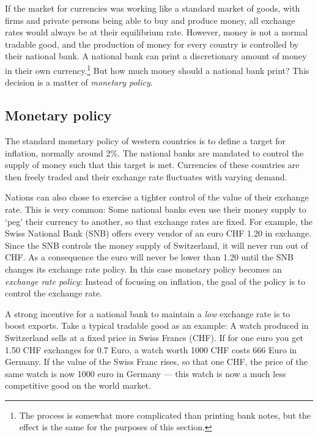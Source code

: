 If the market for currencies was working like a standard market of 
goods, with firms and private persons being able to buy and produce 
money, all exchange rates would always be at their equilibrium rate.  
However, money is not a normal tradable good, and the production of 
money for every country is controlled by their national bank. A national 
bank can print a discretionary amount of money in their own 
currency.\footnote{The process is somewhat more complicated than 
printing bank notes, but the effect is the same for the purposes of this 
section.} But how much money should a national bank print? This decision 
is a matter of \emph{monetary policy}. 

\subsection{Monetary policy}

The standard monetary policy of western countries is to define a target 
for inflation, normally around 2\%. The national banks are mandated to 
control the supply of money such that this target is met. Currencies of 
these countries are then freely traded and their exchange rate 
fluctuates with varying demand. 

Nations can also chose to exercise a tighter control of the value of 
their exchange rate.  This is very common: Some national banks even use 
their money supply to `peg' their currency to another, so that exchange 
rates are fixed.  For example, the Swiss National Bank (SNB) offers 
every vendor of an euro CHF 1.20 in exchange.  Since the SNB controls 
the money supply of Switzerland, it will never run out of CHF. As a 
consequence the euro will never be lower than 1.20 until the SNB changes 
its exchange rate policy. In this case monetary policy becomes an 
\emph{exchange rate policy}: Instead of focusing on inflation, the goal 
of the policy is to control the exchange rate.

A strong incentive for a national bank to maintain a \emph{low} exchange 
rate is to boost exports. Take a typical tradable good as an example: A 
watch produced in Switzerland sells at a fixed price in Swiss Francs 
(CHF). If for one euro you get 1.50 CHF exchanges for 0.7 Euro, a watch 
worth 1000 CHF costs 666 Euro in Germany. If the value of the Swiss 
Franc rises, so that one CHF, the price of the same watch is now 1000 
euro in Germany --- this watch is now a much less competitive good on 
the world market.

